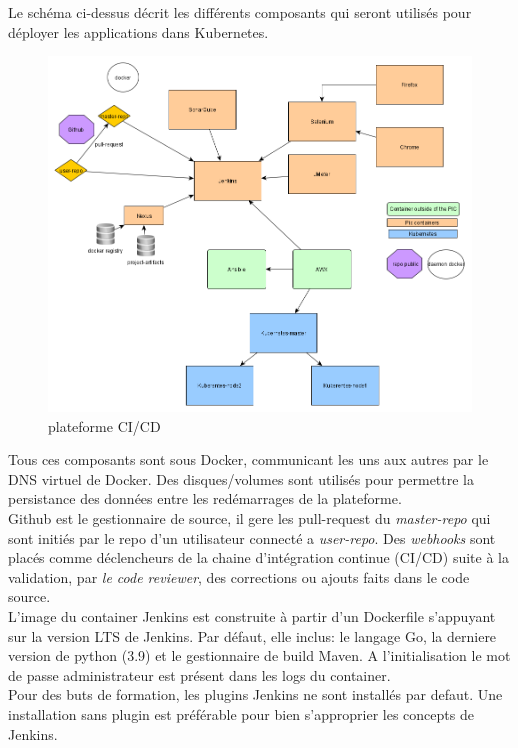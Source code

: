 \documentclass{article}
\begin{document}
Le schéma ci-dessus décrit les différents composants qui seront utilisés pour déployer les applications dans Kubernetes.
\begin{figure}[h!]
\caption{plateforme CI/CD}
	\centering
	\includegraphics[scale=0.35]{../screenshot/schema.png}
\end{figure}
Tous ces composants sont sous Docker, communicant les uns aux autres par le DNS virtuel de Docker. Des disques/volumes sont
utilisés pour permettre la persistance des données entre les redémarrages de la plateforme. \\
Github est le gestionnaire de source, il gere les pull-request du \textit{master-repo} qui sont initiés par le repo d'un
utilisateur connecté a \textit{user-repo}. Des \textit{webhooks} sont placés comme déclencheurs de la chaine d'intégration
continue (CI/CD) suite à la validation, par \textit{le code reviewer}, des corrections ou ajouts faits dans le code source. \\
L'image du container Jenkins est construite à partir d'un Dockerfile s'appuyant sur la version LTS de Jenkins. Par défaut,
elle inclus:  le langage Go, la derniere version de python (3.9) et le gestionnaire de build Maven. A l'initialisation le
mot de passe administrateur est présent dans les logs du container. \\
Pour des buts de formation, les plugins Jenkins ne sont installés par defaut. Une installation sans plugin est préférable
pour bien s'approprier les concepts de Jenkins. \\
\end{document}
